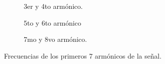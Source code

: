 \begin{figure}[H]
\begin{subfigure}[H]{0.40\textwidth}
          \caption{3er y 4to armónico.}
        \end{subfigure}
        \hfill 
        \begin{subfigure}[H]{0.40\textwidth}
          \caption{5to y 6to armónico}
        \end{subfigure}
        \hfill 
        \begin{subfigure}[H]{0.40\textwidth}
          \caption{7mo y 8vo armónico.}
        \end{subfigure}

        \caption{Frecuencias de los primeros 7 armónicos de la señal.}
        \label{fig:SeñalCuad_MedicFrecOscilo}
      \end{figure}

